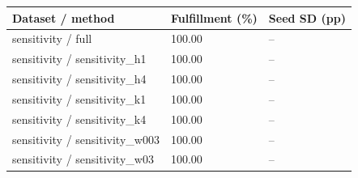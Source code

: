 \begin{tabular}{lll}
\toprule
Dataset / method & Fulfillment (\%) & Seed SD (pp)\\
\midrule
sensitivity / full & 100.00 & --\\
sensitivity / sensitivity\_h1 & 100.00 & --\\
sensitivity / sensitivity\_h4 & 100.00 & --\\
sensitivity / sensitivity\_k1 & 100.00 & --\\
sensitivity / sensitivity\_k4 & 100.00 & --\\
sensitivity / sensitivity\_w003 & 100.00 & --\\
sensitivity / sensitivity\_w03 & 100.00 & --\\
\bottomrule
\end{tabular}